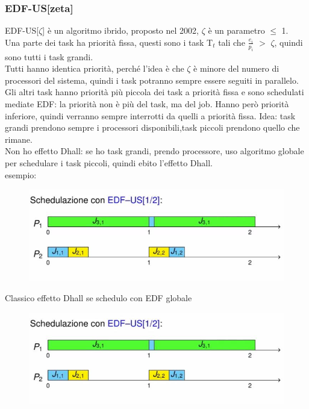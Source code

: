 \documentclass[12pt, oneside]{extbook}
\begin{document}
\subsubsection{EDF-US[zeta]}
EDF-US[$\zeta$] è un algoritmo ibrido, proposto nel 2002, $\zeta$ è un parametro $\leq$ 1.\\ Una parte dei task ha priorità fissa, questi sono i task T$_t$ tali che $\frac{e_i}{p_i}$ $>$ $\zeta$, quindi sono tutti i task grandi.\\ Tutti hanno identica priorità, perché l'idea è che $\zeta$ è minore del numero di processori del sistema, quindi i task potranno sempre essere seguiti in parallelo.\\ Gli altri task hanno priorità più piccola dei task a priorità fissa e sono schedulati mediate EDF: la priorità non è più del task, ma del job. Hanno però priorità inferiore, quindi verranno sempre interrotti da quelli a priorità fissa. Idea: task grandi prendono sempre i processori disponibili,task piccoli prendono quello che rimane.\\ Non ho effetto Dhall: se ho task grandi, prendo processore, uso algoritmo globale per schedulare i task piccoli, quindi ebito l'effetto Dhall.\\ esempio:\\
\begin{figure}[!h]
\centering
\includegraphics[scale=0.4]{immagini/image-043.jpg}
\end{figure}
Classico effetto Dhall se schedulo con EDF globale\\
\begin{figure}[!h]
\centering
\includegraphics[scale=0.4]{immagini/image-044.jpg}
\end{figure}
\end{document}
